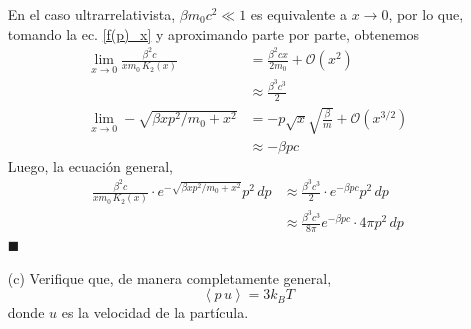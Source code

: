 \documentclass[]{article}
\numberwithin{equation}{section}
\newcommand{\0}{\textcolor{gray}{0}}
\newcommand{\pr}[1]{\left\langle #1 \right\rangle }
\newcommand{\qed}{\hfill\(\blacksquare\)}
\begin{document}
\begin{enumerate}
	En el caso ultrarrelativista, $\beta m_0 c^2 \ll 1$ es equivalente a $x\rightarrow0$, por lo que, tomando la ec. \ref{f(p)_x} y aproximando parte por parte, obtenemos
	\begin{align*}
		\lim_{x \rightarrow 0} \frac{\beta^2 c}{x m_0 \, K_2 (x)} &= \frac{\beta ^2 c x}{2 m_0} +  \mathcal{O}\left(x^2\right) \\
		&\approx \frac{\beta ^3 c^3}{2} \\
		\lim_{x \rightarrow 0} - \sqrt{\beta x p^2/m_0 + x^2} &= -p \sqrt{x} \sqrt{\frac{\beta }{m}}  + \mathcal{O}\left(x^{3/2}\right)\\
		&\approx - \beta p c
	\end{align*}
	Luego, la ecuación general,
	\begin{align}
		\frac{\beta^2 c}{x m_0 \, K_2 (x)} \cdot e^{- \sqrt{\beta x p^2/m_0 + x^2}} p^2 \, dp &\approx  \frac{\beta ^3 c^3}{2} \cdot e^{- \beta p c} p^2 \, dp \nonumber\\
		&\approx \frac{\beta ^3 c^3}{8 \pi} e^{- \beta p c} \cdot 4 \pi p^2 \, dp
	\end{align}
	\qed
	
	\item[(c)] Verifique que, de manera completamente general,
	\begin{equation}
		\pr{p \, u} = 3 k_B T
	\end{equation}
	donde $u$ es la velocidad de la partícula.
	\\
	

\end{enumerate}
\end{document}
